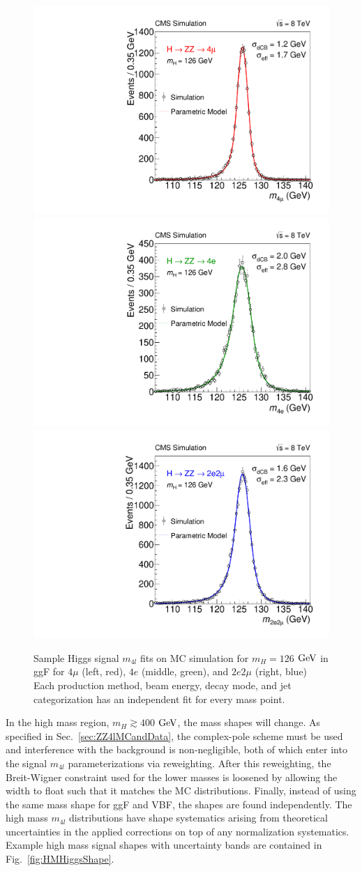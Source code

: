 \begin{figure}[htbp]
\begin{center}
\includegraphics[width=.3\linewidth]{HiggsDiscovery/figures/fitM126_channel0.pdf}
\includegraphics[width=.3\linewidth]{HiggsDiscovery/figures/fitM126_channel1.pdf}
\includegraphics[width=.3\linewidth]{HiggsDiscovery/figures/fitM126_channel2.pdf}
\caption[Low Mass Higgs Signal Mass Shapes]{Sample Higgs signal $m_{4l}$ fits on MC simulation for $m_H=126$ $\rm{GeV}$ in ggF for $4\mu$ (left, red), $4e$ (middle, green), and $2e2\mu$ (right, blue) Each production method, beam energy, decay mode, and jet categorization has an independent fit for every mass point.}
\label{fig:LMHiggsShape}
\end{center}
\end{figure}

In the high mass region, $m_H \gtrsim 400$ $\rm{GeV}$, the mass shapes will change. As specified in Sec.~\ref{sec:ZZ4lMCandData}, the complex-pole scheme must be used and interference with the background is non-negligible, both of which enter into the signal $m_{4l}$ parameterizations via reweighting. After this reweighting, the Breit-Wigner constraint used for the lower masses is loosened by allowing the width to float such that it matches the MC distributions. Finally, instead of using the same mass shape for ggF and VBF, the shapes are found independently. The high mass $m_{4l}$ distributions have shape systematics arising from theoretical uncertainties in the applied corrections on top of any normalization systematics. Example high mass signal shapes with uncertainty bands are contained in Fig.~\ref{fig:HMHiggsShape}.

